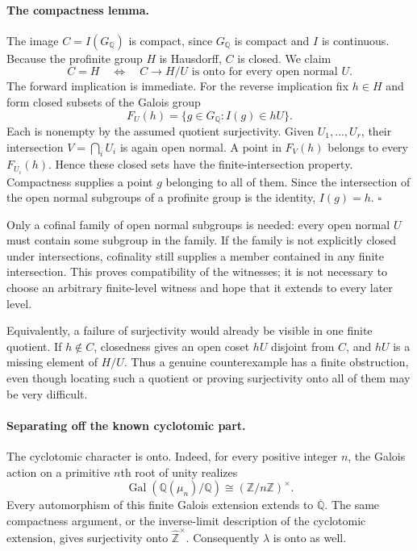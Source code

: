 \documentclass[11pt]{article}
\begin{document}
\paragraph{The compactness lemma.}
The image $C=I(G_{\mathbb Q})$ is compact, since $G_{\mathbb Q}$ is compact and $I$ is continuous. Because the profinite group $H$ is Hausdorff, $C$ is closed. We claim
\[
 C=H\quad\Longleftrightarrow\quad
 C\longrightarrow H/U\text{ is onto for every open normal }U.
 \tag{91.3}
\]
The forward implication is immediate. For the reverse implication fix $h\in H$ and form closed subsets of the Galois group
\[
 F_U(h)=\{g\in G_{\mathbb Q}:I(g)\in hU\}.
\]
Each is nonempty by the assumed quotient surjectivity. Given $U_1,\ldots,U_r$, their intersection $V=\bigcap_iU_i$ is again open normal. A point in $F_V(h)$ belongs to every $F_{U_i}(h)$. Hence these closed sets have the finite-intersection property. Compactness supplies a point $g$ belonging to all of them. Since the intersection of the open normal subgroups of a profinite group is the identity, $I(g)=h$. \hfill$\square$

Only a cofinal family of open normal subgroups is needed: every open normal $U$ must contain some subgroup in the family. If the family is not explicitly closed under intersections, cofinality still supplies a member contained in any finite intersection. This proves compatibility of the witnesses; it is not necessary to choose an arbitrary finite-level witness and hope that it extends to every later level.

Equivalently, a failure of surjectivity would already be visible in one finite quotient. If $h\notin C$, closedness gives an open coset $hU$ disjoint from $C$, and $hU$ is a missing element of $H/U$. Thus a genuine counterexample has a finite obstruction, even though locating such a quotient or proving surjectivity onto all of them may be very difficult.

\paragraph{Separating off the known cyclotomic part.}
The cyclotomic character is onto. Indeed, for every positive integer $n$, the Galois action on a primitive $n$th root of unity realizes
\[
 \operatorname{Gal}(\mathbb Q(\mu_n)/\mathbb Q)
       \cong(\mathbb Z/n\mathbb Z)^{\times}.
\]
Every automorphism of this finite Galois extension extends to $\overline{\mathbb Q}$. The same compactness argument, or the inverse-limit description of the cyclotomic extension, gives surjectivity onto $\widehat{\mathbb Z}^{\times}$. Consequently $\lambda$ is onto as well.
\end{document}
